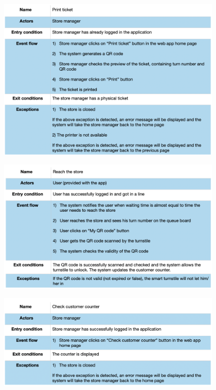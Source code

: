 \documentclass{article}
\begin{document}
\begin{figure}[H]
  \includegraphics[width=\linewidth]{PrintTicketUseCase.png}
  
\end{figure}

\begin{figure}[H]
  \includegraphics[width=\linewidth]{ReachStoreUseCase.png}
  
\end{figure}

\begin{figure}[H]
  \includegraphics[width=\linewidth]{CheckCustomerCounterUseCase.png}
  
\end{figure}
\end{document}
